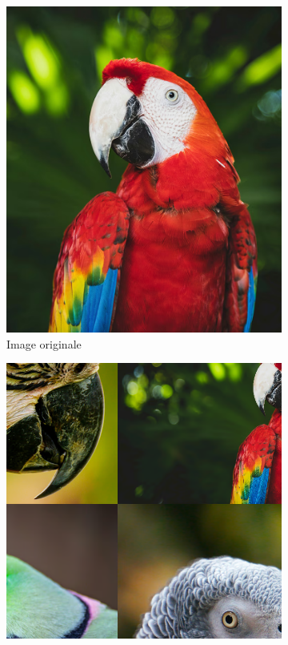 \begin{figure}[H]
    \centering
    \begin{subfigure}[b]{0.42\textwidth}
        \centering
        \includegraphics[width=\textwidth]{02-main/figures/ch3/ch36_augmentations_00a_yolo_exemple1_original.png}
        \caption{Image originale}
        \label{fig:ch36_augmentations_00a_yolo_exemple1_original}
    \end{subfigure}
    \hfill
    \begin{subfigure}[b]{0.49\textwidth}
        \centering
        \includegraphics[width=\textwidth]{02-main/figures/ch3/ch36_augmentations_00b_yolo_exemple1_mosaic.png}

\end{subfigure}
\end{figure}
